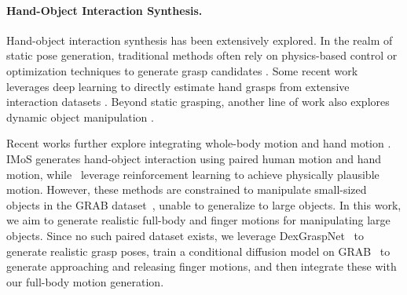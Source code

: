 \paragraph{Hand-Object Interaction Synthesis. }
Hand-object interaction synthesis has been extensively explored.
In the realm of static pose generation, traditional methods often rely on physics-based control or optimization techniques to generate grasp candidates \cite{li2007data, pollard2005physically, rodriguez2012caging}. 
Some recent work leverages deep learning to directly estimate hand grasps from extensive interaction datasets \cite{jiang2021hand, brahmbhatt2019contactgrasp, karunratanakul2020grasping, GRAB:2020, fan2023arctic, christen2024diffh2o}. 
Beyond static grasping, another line of work also explores dynamic object manipulation \cite{zhang2021manipnet, ye2012synthesis, liu2024geneoh}. 

Recent works further explore integrating whole-body motion and hand motion \cite{taheri2023grip, tendulkar2023flex, wu2022saga, taheri2022goal}.
IMoS \cite{ghosh2023imos} generates hand-object interaction using paired human motion and hand motion, while~\cite{braun2023physically} leverage reinforcement learning to achieve physically plausible motion.
However, these methods are constrained to manipulate small-sized objects in the GRAB dataset~\cite{GRAB:2020}, unable to generalize to large objects. 
In this work, we aim to generate realistic full-body and finger motions for manipulating large objects. Since no such paired dataset exists, we leverage DexGraspNet~\cite{wang2023dexgraspnet} to generate realistic grasp poses, train a conditional diffusion model on GRAB~\cite{GRAB:2020} to generate approaching and releasing finger motions, and then integrate these with our full-body motion generation.   

